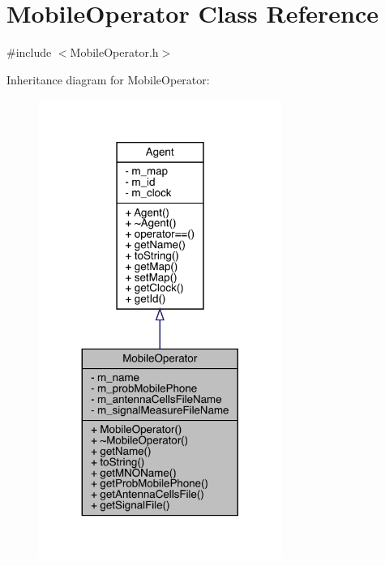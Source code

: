 \hypertarget{class_mobile_operator}{}\section{Mobile\+Operator Class Reference}
\label{class_mobile_operator}


{\ttfamily \#include $<$Mobile\+Operator.\+h$>$}



Inheritance diagram for Mobile\+Operator\+:
\nopagebreak
\begin{figure}[H]
\begin{center}
\leavevmode
\includegraphics[width=224pt]{class_mobile_operator__inherit__graph}
\end{center}
\end{figure}


